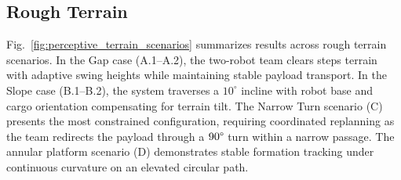 \subsection{Rough Terrain}
Fig.~\ref{fig:perceptive_terrain_scenarios} summarizes results across rough terrain scenarios. In the Gap case (A.1–A.2), the two-robot team clears steps terrain with adaptive swing heights while maintaining stable payload transport. In the Slope case (B.1–B.2), the system traverses a $10^\circ$ incline with robot base and cargo orientation compensating for terrain tilt. The Narrow Turn scenario (C) presents the most constrained configuration, requiring coordinated replanning as the team redirects the payload through a $90 \degree$ turn within a narrow passage. The annular platform scenario (D) demonstrates stable formation tracking under continuous curvature on an elevated circular path.



